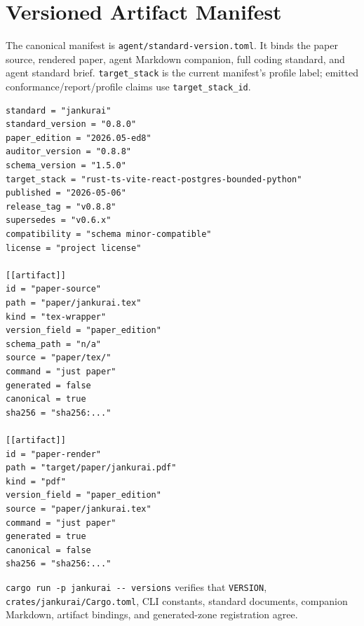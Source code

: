 \section{Versioned Artifact Manifest}

The canonical manifest is \texttt{agent/standard-version.toml}. It binds the paper source, rendered paper, agent Markdown companion, full coding standard, and agent standard brief. \texttt{target\_stack} is the current manifest's profile label; emitted conformance/report/profile claims use \texttt{target\_stack\_id}.

\begin{lstlisting}[style=codebox]
standard = "jankurai"
standard_version = "0.8.0"
paper_edition = "2026.05-ed8"
auditor_version = "0.8.8"
schema_version = "1.5.0"
target_stack = "rust-ts-vite-react-postgres-bounded-python"
published = "2026-05-06"
release_tag = "v0.8.8"
supersedes = "v0.6.x"
compatibility = "schema minor-compatible"
license = "project license"

[[artifact]]
id = "paper-source"
path = "paper/jankurai.tex"
kind = "tex-wrapper"
version_field = "paper_edition"
schema_path = "n/a"
source = "paper/tex/"
command = "just paper"
generated = false
canonical = true
sha256 = "sha256:..."

[[artifact]]
id = "paper-render"
path = "target/paper/jankurai.pdf"
kind = "pdf"
version_field = "paper_edition"
source = "paper/jankurai.tex"
command = "just paper"
generated = true
canonical = false
sha256 = "sha256:..."
\end{lstlisting}

\verb|cargo run -p jankurai -- versions| verifies that \texttt{VERSION}, \texttt{crates/jankurai/Cargo.toml}, CLI constants, standard documents, companion Markdown, artifact bindings, and generated-zone registration agree.
